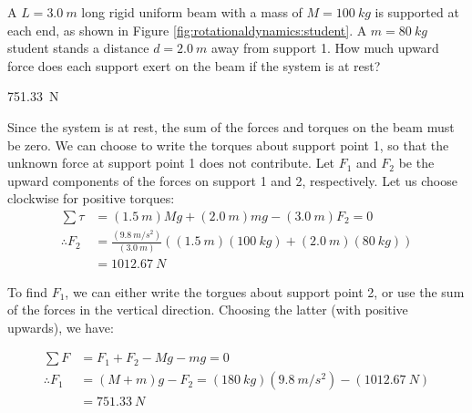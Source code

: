 %
%
\question A $L=\SI{3.0}{m}$ long rigid uniform beam with a mass of $M=\SI{100}{kg}$ is supported at each end, as shown in Figure \ref{fig:rotationaldynamics:student}. A $m=\SI{80}{kg}$ student stands a distance $d=\SI{2.0}{m}$ away from support 1. How much upward force does each support exert on the beam if the system is at rest?

\begin{finalanswer}
\SI{751.33}{N}
\end{finalanswer}
\begin{solution} 
Since the system is at rest, the sum of the forces and torques on the beam must be zero. We can choose to write the torques about support point 1, so that the unknown force at support point 1 does not contribute. Let $F_1$ and $F_2$ be the upward components of the forces on support 1 and 2, respectively. Let us choose clockwise for positive torques:
\begin{align*}
\sum \tau &= (\SI{1.5}{m})Mg+(\SI{2.0}{m})mg-(\SI{3.0}{m})F_2=0\\
\therefore F_2& = \frac{(\SI{9.8}{m/s^2})}{(\SI{3.0}{m})}((\SI{1.5}{m})(\SI{100}{kg})+(\SI{2.0}{m})(\SI{80}{kg}))\\
&=\SI{1012.67}{N}
\end{align*}

To find $F_1$, we can either write the torgues about support point 2, or use the sum of the forces in the vertical direction. Choosing the latter (with positive upwards), we have:

\begin{align*}
\sum F &= F_1+F_2-Mg-mg=0\\
\therefore F_1&=(M+m)g-F_2=(\SI{180}{kg})(\SI{9.8}{m/s^2})-(\SI{1012.67}{N})\\
&=\SI{751.33}{N}
\end{align*}
\end{solution}

